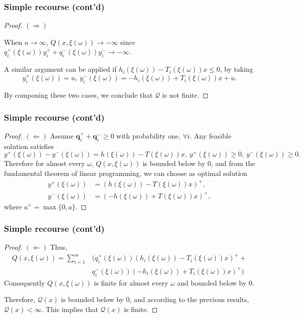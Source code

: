 \documentclass{beamer}
\begin{document}
\begin{frame}
\frametitle{Simple recourse (cont'd)}

\begin{proof}
{\bf $(\Rightarrow)$} 

When $u \rightarrow \infty$, $Q(x, \xi(\omega)) \rightarrow -\infty$ since $q_i^+(\xi(\omega))y_i^+ + q_i^-(\xi(\omega))y_i^- \rightarrow -\infty$.

\mbox{}

A similar argument can be applied if $h_i(\xi(\omega))-T_i(\xi(\omega))x \leq 0$, by taking
$$
y_i^+(\xi(\omega)) = u,\ y_i^-(\xi(\omega)) = -h_i(\xi(\omega)) + T_i(\xi(\omega))x + u.
$$

\mbox{}

By componing these two cases, we conclude that  $\mathcal{Q}$ is not finite.
\end{proof}

\end{frame}

\begin{frame}
\frametitle{Simple recourse (cont'd)}
	
\begin{proof}

{\bf $(\Leftarrow)$}
Assume $\boldsymbol{q}_i^+ + \boldsymbol{q}_i^- \geq 0$ with probability one, $\forall i$.
Any feasible solution satisfies
$$
y^+(\xi(\omega))-y^-(\xi(\omega))=h(\xi(\omega))-T(\xi(\omega))x, \ y^+(\xi(\omega)) \geq 0,\ y^-(\xi(\omega)) \geq 0.
$$
Therefore for almost every $\omega$, $Q(x,\xi(\omega))$ is bounded below by 0, and
from the fundamental theorem of linear programming, we can choose as optimal solution
\begin{align*}
y^+(\xi(\omega)) &= \left(h(\xi(\omega))-T(\xi(\omega))x\right)^+,\\
y^-(\xi(\omega)) &= \left(-h(\xi(\omega))+T(\xi(\omega))x\right)^+,
\end{align*}
where $a^+ = \max\{0, a\}$.
\end{proof}

\end{frame}

\begin{frame}
\frametitle{Simple recourse (cont'd)}

\begin{proof}
{\bf $(\Leftarrow)$}
Thus,
\begin{align*}
Q(x,\xi(\omega)) = \sum_{i=1}^{m} & (q_i^+(\xi(\omega))(h_i(\xi(\omega))-T_i(\xi(\omega))x)^+ + \\
& q_i^-(\xi(\omega))(-h_i(\xi(\omega))+T_i(\xi(\omega))x)^+ )
\end{align*}
Consequently $Q(x,\xi(\omega))$ is finite for almost every $\omega$ and bounded below by 0.

\mbox{}

Therefore, $\mathcal{Q}(x)$ is bounded below by 0, and according to the previous results, $\mathcal{Q}(x) < \infty$. This implies that $\mathcal{Q}(x)$ is finite.
\end{proof}

\end{frame}
\end{document}
